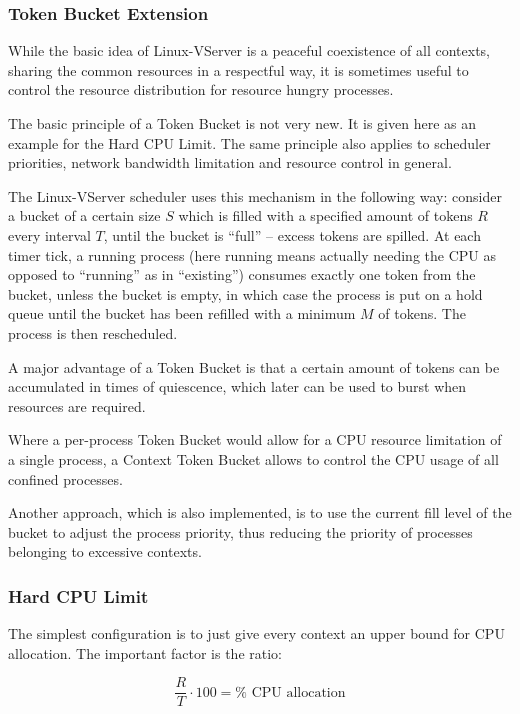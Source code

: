\subsubsection{Token Bucket Extension}

While the basic idea of Linux-VServer is a peaceful coexistence of all
contexts, sharing the common resources in a respectful way, it is sometimes
useful to control the resource distribution for resource hungry processes.

The basic principle of a Token Bucket is not very new. It is given here as an
example for the Hard CPU Limit. The same principle also applies to scheduler
priorities, network bandwidth limitation and resource control in general.

The Linux-VServer scheduler uses this mechanism in the following way: consider
a bucket of a certain size $S$ which is filled with a specified amount of
tokens $R$ every interval $T$, until the bucket is ``full'' -- excess tokens
are spilled. At each timer tick, a running process (here running means
actually needing the CPU as opposed to ``running'' as in ``existing'') consumes
exactly one token from the bucket, unless the bucket is empty, in which case
the process is put on a hold queue until the bucket has been refilled with a
minimum $M$ of tokens. The process is then rescheduled.

A major advantage of a Token Bucket is that a certain amount of tokens can be
accumulated in times of quiescence, which later can be used to burst when
resources are required.

Where a per-process Token Bucket would allow for a CPU resource limitation
of a single process, a Context Token Bucket allows to control the CPU usage
of all confined processes.

Another approach, which is also implemented, is to use the current fill
level of the bucket to adjust the process priority, thus reducing the
priority of processes belonging to excessive contexts.

\subsubsection{Hard CPU Limit}

The simplest configuration is to just give every context an upper bound for
CPU allocation. The important factor is the ratio:

\begin{center}
$$\frac{R}{T} \cdot 100 = \%\mbox{ CPU allocation}$$
\end{center}


